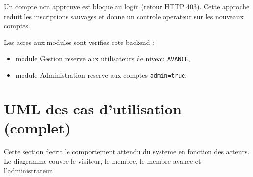 \documentclass[11pt,a4paper]{article}
\begin{document}
Un compte non approuve est bloque au login (retour HTTP 403).
Cette approche reduit les inscriptions sauvages et donne un controle operateur
sur les nouveaux comptes.

Les acces aux modules sont verifies cote backend :
\begin{itemize}
  \item module Gestion reserve aux utilisateurs de niveau \texttt{AVANCE},
  \item module Administration reserve aux comptes \texttt{admin=true}.
\end{itemize}

\section{UML des cas d'utilisation (complet)}

Cette section decrit le comportement attendu du systeme en fonction des acteurs.
Le diagramme couvre le visiteur, le membre, le membre avance et l'administrateur.
\end{document}
